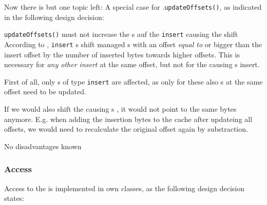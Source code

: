 Now there is but one topic left: A special case for \MediumReferenceRepository{}.\texttt{updateOffsets()}, as indicated in the following design decision:

{%
\texttt{updateOffsets()} must not increase the \IMediumReference{}s auf the \texttt{insert} \MediumAction{} causing the shift
}
{%
According to , \texttt{insert} \MediumAction{}s shift managed \IMediumReference{}s with an offset \emph{equal to} or bigger than the insert offset by the number of inserted bytes towards higher offsets. This is necessary for \emph{any other insert} at the same offset, but not for the causing \MediumAction{}s insert.
}
{%
First of all, only \MediumAction{}s of type \texttt{insert} are affected, as only for these also \IMediumReference{}s at the same offset need to be updated. 

If we would also shift the causing \MediumAction{}s \IMediumReference{}, it would not point to the same bytes anymore. E.g. when adding the insertion bytes to the cache after updateing all offsets, we would need to recalculate the original offset again by substraction.
}
{%
No disadvantages known
}


\subsubsection{\TERMmedium{} Access}
\label{sec:ZugriffAufDasMedium}

Access to the \TERMmedium{} is implemented in own classes, as the following design decision states:

